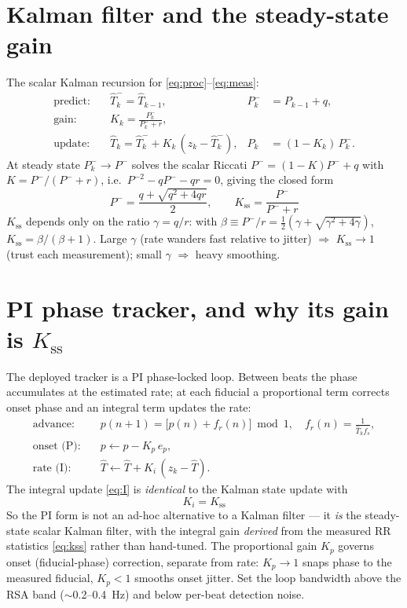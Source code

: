 \documentclass[11pt]{article}
\newcommand{\RRhat}{\widehat{T}}
\begin{document}
\section{Kalman filter and the steady-state gain}

The scalar Kalman recursion for \eqref{eq:proc}--\eqref{eq:meas}:
\begin{align}
\text{predict:}\quad & \RRhat_k^- = \RRhat_{k-1}, & P_k^- &= P_{k-1} + q, \\
\text{gain:}\quad & K_k = \frac{P_k^-}{P_k^- + r}, \\
\text{update:}\quad & \RRhat_k = \RRhat_k^- + K_k\,(z_k - \RRhat_k^-), & P_k &= (1-K_k)\,P_k^-.
\end{align}
At steady state $P_k^-\to P^-$ solves the scalar Riccati $P^- = (1-K)P^- + q$ with $K=P^-/(P^-+r)$,
i.e.\ $P^{-2} - qP^- - qr = 0$, giving the closed form
\begin{equation}
\boxed{\;P^- = \frac{q + \sqrt{q^2 + 4qr}}{2},
\qquad
K_{\mathrm{ss}} = \frac{P^-}{P^- + r}\;}
\label{eq:kss}
\end{equation}
$K_{\mathrm{ss}}$ depends only on the ratio $\gamma = q/r$: with $\beta \equiv P^-/r =
\tfrac12(\gamma + \sqrt{\gamma^2+4\gamma})$, $K_{\mathrm{ss}} = \beta/(\beta+1)$. Large $\gamma$
(rate wanders fast relative to jitter) $\Rightarrow$ $K_{\mathrm{ss}}\to 1$ (trust each measurement);
small $\gamma$ $\Rightarrow$ heavy smoothing.

\section{PI phase tracker, and why its gain is $K_{\mathrm{ss}}$}

The deployed tracker is a PI phase-locked loop. Between beats the phase accumulates at the estimated
rate; at each fiducial a proportional term corrects onset phase and an integral term updates the rate:
\begin{align}
\text{advance:}\quad & p(n\!+\!1) = \bigl[p(n) + f_r(n)\bigr]\bmod 1, \quad f_r(n) = \tfrac{1}{\RRhat_k f_s}, \\
\text{onset (P):}\quad & p \leftarrow p - K_p\, e_p, \label{eq:P}\\
\text{rate (I):}\quad & \RRhat \leftarrow \RRhat + K_i\,(z_k - \RRhat). \label{eq:I}
\end{align}
The integral update \eqref{eq:I} is \emph{identical} to the Kalman state update with
\begin{equation}
\boxed{\,K_i = K_{\mathrm{ss}}\,}
\end{equation}
So the PI form is not an ad-hoc alternative to a Kalman filter --- it \emph{is} the steady-state
scalar Kalman filter, with the integral gain \emph{derived} from the measured RR statistics
\eqref{eq:kss} rather than hand-tuned. The proportional gain $K_p$ governs onset (fiducial-phase)
correction, separate from rate: $K_p\!\to\!1$ snaps phase to the measured fiducial, $K_p\!<\!1$
smooths onset jitter. Set the loop bandwidth above the RSA band ($\sim$0.2--0.4~Hz) and below
per-beat detection noise.
\end{document}
